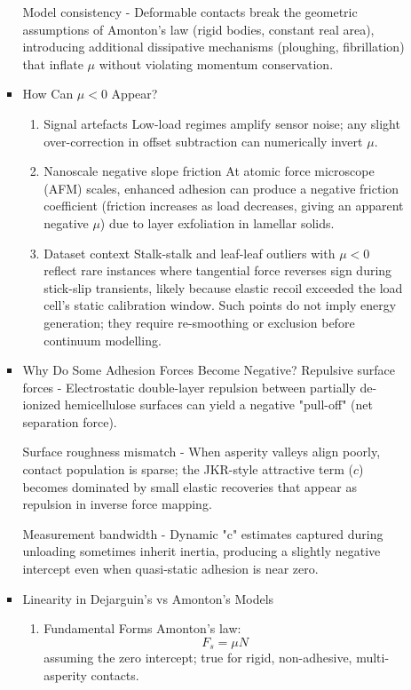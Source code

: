 \documentclass[xcolor=dvipsnames,10pt,hidelinks]{article}
\begin{document}
\begin{itemize}
\begin{itemize}
\begin{itemize}
Model consistency - Deformable contacts break the geometric assumptions of Amonton's law (rigid bodies, constant real area), introducing additional dissipative mechanisms (ploughing, fibrillation) that inflate \(\mu\) without violating momentum conservation.
\item How Can \(\mu < 0\) Appear? \newline
\label{sec:orgd882ef8}
\begin{enumerate}
\item Signal artefacts \newline
Low-load regimes amplify sensor noise; any slight over-correction in offset subtraction can numerically invert \(\mu\).

\item Nanoscale negative slope friction\newline
At atomic force microscope (AFM) scales, enhanced adhesion can produce a negative friction coefficient
 (friction increases as load decreases, giving an apparent negative \(\mu\)) due to layer exfoliation in lamellar solids.

\item Dataset context \newline
Stalk-stalk and leaf-leaf outliers with \(\mu < 0\) reflect rare instances where tangential force reverses sign during stick-slip transients,
likely because elastic recoil exceeded the load cell's static calibration window.
Such points do not imply energy generation; they require re-smoothing or exclusion before continuum modelling.
\end{enumerate}
\item Why Do Some Adhesion Forces Become Negative? \newline
\label{sec:orgfe88df6}
Repulsive surface forces - Electrostatic double-layer repulsion between partially de-ionized hemicellulose surfaces can yield a negative "pull-off" (net separation force).

Surface roughness mismatch - When asperity valleys align poorly, contact population is sparse; the JKR-style attractive term (\(c\)) becomes dominated by small elastic recoveries that appear as repulsion in inverse force mapping.

Measurement bandwidth - Dynamic "c" estimates captured during unloading sometimes inherit inertia, producing a slightly negative intercept even when quasi-static adhesion is near zero.
\item Linearity in Dejarguin's vs Amonton's Models \newline
\label{sec:org7545c89}
\begin{enumerate}
\item Fundamental Forms
Amonton's law:
\[F_s = \mu N\]
 assuming the zero intercept; true for rigid, non-adhesive, multi-asperity contacts.


\end{enumerate}
\end{itemize}
\end{itemize}
\end{itemize}
\end{document}
